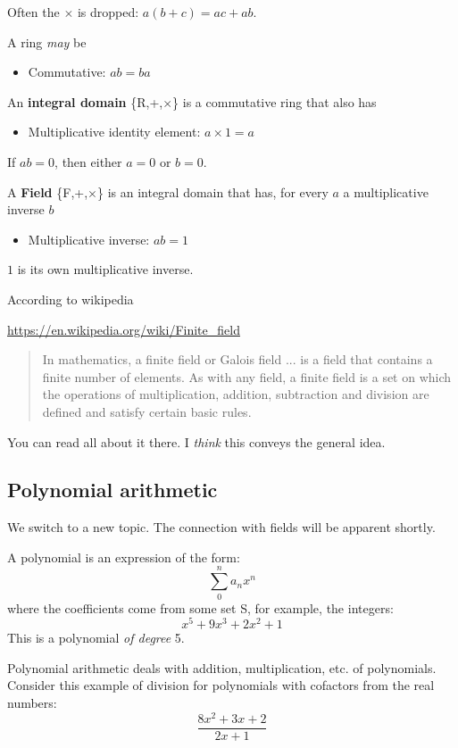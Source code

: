 \documentclass[11pt, oneside]{article}
\begin{document}
Often the $\times$ is dropped:  $a(b + c) = ac + ab$.  

A ring \emph{may} be 
\begin{itemize}
\item Commutative:    $ab = ba$
\end{itemize}

An \textbf{integral domain} \{R,+,$\times$\} is a commutative ring that also has
\begin{itemize}
\item Multiplicative identity element:    $a \times 1 = a$
\end{itemize}

If $ab = 0$, then either $a = 0$ or $b = 0$.

A \textbf{Field} \{F,+,$\times$\} is an integral domain that has, for every $a$ a multiplicative inverse $b$
\begin{itemize}
\item Multiplicative inverse:   $ab = 1$
\end{itemize}

$1$ is its own multiplicative inverse.

According to wikipedia

\url{https://en.wikipedia.org/wiki/Finite_field}

\begin{quote}In mathematics, a finite field or Galois field ... is a field that contains a finite number of elements. As with any field, a finite field is a set on which the operations of multiplication, addition, subtraction and division are defined and satisfy certain basic rules.\end{quote}

You can read all about it there.  I \emph{think} this conveys the general idea.  

\subsection*{Polynomial arithmetic}
We switch to a new topic.  The connection with fields will be apparent shortly.

A polynomial is an expression of the form:
\[ \sum_0^n a_n x^n \]
where the coefficients come from some set S, for example, the integers:
\[ x^5 + 9x^3 + 2x^2 + 1 \]
This is a polynomial \emph{of degree} 5.

Polynomial arithmetic deals with addition, multiplication, etc. of polynomials.  Consider this example of division for polynomials with cofactors from the real numbers:
\[ \frac{8x^2 + 3x + 2 }{2x + 1} \]
\end{document}
